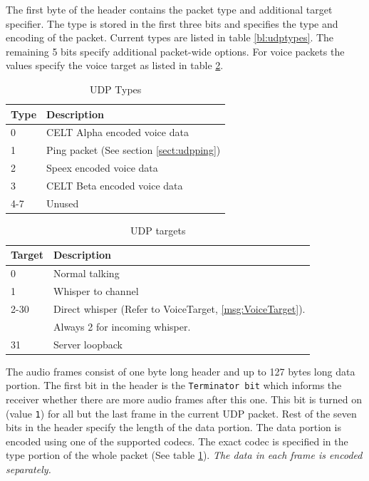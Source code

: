 \documentclass[11pt]{article} %
\begin{document}
The first byte of the header contains the packet type and additional target specifier. The type is stored in the first three bits and specifies the type and encoding of the packet. Current types are listed in table \ref{bl:udptypes}. The remaining 5 bits specify additional packet-wide options. For voice packets the values specify the voice target as listed in table \ref{tbl:udptargets}.

\begin{table}[htp]\begin{center}
	\caption{UDP Types}\label{tbl:udptypes}

	\begin{tabular}{ll}
		Type & Description \\
		\hline
		0	& CELT Alpha encoded voice data \\
		1	& Ping packet (See section \ref{sect:udpping}) \\
		2	& Speex encoded voice data \\
		3	& CELT Beta encoded voice data \\
		4-7 & Unused
	\end{tabular}
\end{center}\end{table}

\begin{table}[htp]\begin{center}
	\caption{UDP targets}\label{tbl:udptargets}

	\begin{tabular}{ll}
		Target & Description \\
		\hline
		0	& Normal talking \\
		1	& Whisper to channel \\
		2-30	& Direct whisper (Refer to VoiceTarget, \ref{msg:VoiceTarget}). \\
			& Always 2 for incoming whisper. \\
		31	& Server loopback
	\end{tabular}
\end{center}\end{table}

The audio frames consist of one byte long header and up to 127 bytes long data portion. The first bit in the header is the \texttt{Terminator bit} which informs the receiver whether there are more audio frames after this one. This bit is turned on (value \texttt{1}) for all but the last frame in the current UDP packet. Rest of the seven bits in the header specify the length of the data portion. The data portion is encoded using one of the supported codecs. The exact codec is specified in the type portion of the whole packet (See table \ref{tbl:udptypes}). \emph{The data in each frame is encoded separately.}
\end{document}
